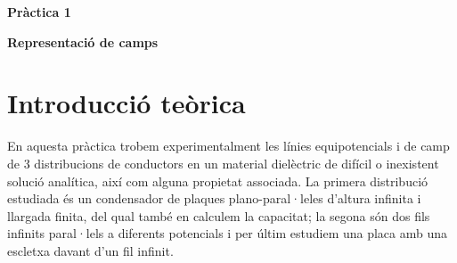 \documentclass[11pt]{article}
\begin{document}
\tableofcontents
\newpage
\vspace{10em}

{\huge \textbf{Pràctica 1}}  %

\vspace{0.5em}  %

{\Huge \textbf{Representació de camps}}  %

\vspace{2em}  %


\begin{abstract}
    En aquesta pràctica estudiem les línies equipotencials i de camp de tres distribucions de conductors en un medi dielèctric assumint simetria en l'eix vertical. Un condensador plano-paral·lel, dos fils infinits i una geometria escollida entre els membres del grup que replica la disposició d'un experiment de difracció. Els resultats obtinguts són corroborats per simulacions computacionals i comparats amb els resultats del cas ideal dels que en difereix substancialment. També s'obté experimentalment la capacitat del condensador i es conclou que no difereix significativament del càlcul ideal.
\end{abstract}


\section{Introducció teòrica}\label{sec: intro}
En aquesta pràctica trobem experimentalment les línies equipotencials i de camp de 3 distribucions de conductors en un material dielèctric de difícil o inexistent solució analítica, així com alguna propietat associada. La primera distribució estudiada és un condensador de plaques plano-paral·leles d'altura infinita i llargada finita, del qual també en calculem la capacitat; la segona són dos fils infinits paral·lels a diferents potencials i per últim estudiem una placa amb una escletxa davant d'un fil infinit.
\end{document}
